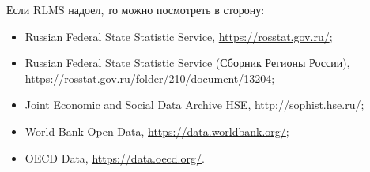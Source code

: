 \documentclass[12pt]{article}
\begin{document}
\newpage
Если RLMS надоел, то можно посмотреть в сторону:
\begin{itemize}
\item Russian Federal State Statistic Service, \url{https://rosstat.gov.ru/};
\item Russian Federal State Statistic Service (Сборник Регионы России), \url{https://rosstat.gov.ru/folder/210/document/13204};
\item Joint Economic and Social Data Archive HSE, \url{http://sophist.hse.ru/};
\item World Bank Open Data, \url{https://data.worldbank.org/};
\item OECD Data, \url{https://data.oecd.org/}.
\end{itemize}
\end{document}
